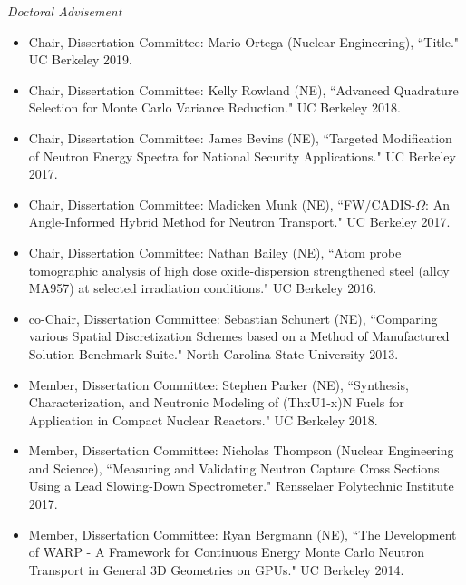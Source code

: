 \textit{Doctoral Advisement}
\begin{itemize}
\item Chair, Dissertation Committee: Mario Ortega (Nuclear Engineering), ``Title."  UC Berkeley 2019.
%
\item Chair, Dissertation Committee: Kelly Rowland (NE), ``Advanced Quadrature Selection for Monte Carlo Variance Reduction."  UC Berkeley 2018.
%
\item Chair, Dissertation Committee: James Bevins (NE), ``Targeted Modification of Neutron Energy Spectra for National Security Applications."  UC Berkeley 2017.
%
\item Chair, Dissertation Committee: Madicken Munk (NE), ``FW/CADIS-$\Omega$: An Angle-Informed Hybrid Method for Neutron Transport."  UC Berkeley 2017.
%
\item Chair, Dissertation Committee: Nathan Bailey (NE), ``Atom probe tomographic analysis of high dose oxide-dispersion strengthened steel (alloy MA957) at selected irradiation conditions."  UC Berkeley 2016.
%
\item co-Chair, Dissertation Committee: Sebastian Schunert (NE), ``Comparing various Spatial Discretization Schemes based on a Method of Manufactured Solution Benchmark Suite." North Carolina State University 2013.
%
\item Member, Dissertation Committee: Stephen Parker (NE), ``Synthesis, Characterization, and Neutronic Modeling of (ThxU1-x)N Fuels for Application in Compact Nuclear Reactors."  UC Berkeley 2018.
%
\item Member, Dissertation Committee: Nicholas Thompson (Nuclear Engineering and Science), ``Measuring and Validating Neutron Capture Cross Sections Using a Lead Slowing-Down Spectrometer."  Rensselaer Polytechnic Institute 2017.
%
\item Member, Dissertation Committee: Ryan Bergmann (NE), ``The Development of WARP - A Framework for Continuous Energy Monte Carlo Neutron Transport in General 3D Geometries on GPUs."  UC Berkeley 2014.
\end{itemize}


